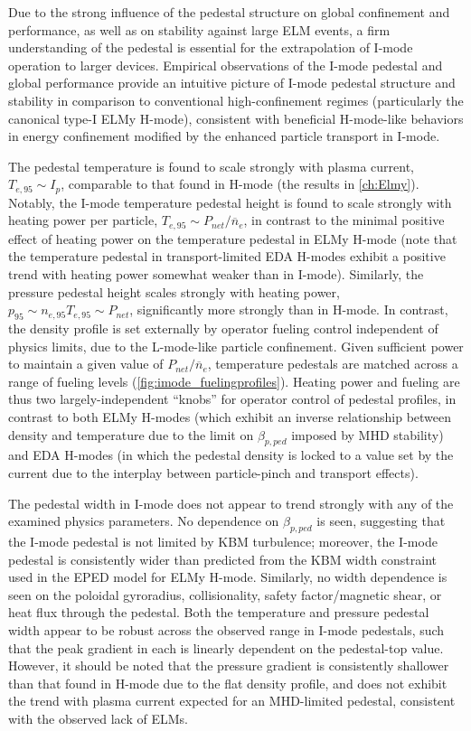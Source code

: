 Due to the strong influence of the pedestal structure on global confinement and performance, as well as on stability against large ELM events, a firm understanding of the pedestal is essential for the extrapolation of I-mode operation to larger devices.  Empirical observations of the I-mode pedestal and global performance provide an intuitive picture of I-mode pedestal structure and stability in comparison to conventional high-confinement regimes (particularly the canonical type-I ELMy H-mode), consistent with beneficial H-mode-like behaviors in energy confinement modified by the enhanced particle transport in I-mode.

The pedestal temperature is found to scale strongly with plasma current, $T_{e,95} \sim I_p$, comparable to that found in H-mode (\cf the results in \cref{ch:Elmy}).  Notably, the I-mode temperature pedestal height is found to scale strongly with heating power per particle, $T_{e,95} \sim P_{net}/\overline{n}_e$, in contrast to the minimal positive effect of heating power on the temperature pedestal in ELMy H-mode (note that the temperature pedestal in transport-limited EDA H-modes exhibit a positive trend with heating power somewhat weaker than in I-mode).    Similarly, the pressure pedestal height scales strongly with heating power, $p_{95} \sim n_{e,95} T_{e,95} \sim P_{net}$, significantly more strongly than in H-mode.  In contrast, the density profile is set externally by operator fueling control independent of physics limits, due to the L-mode-like particle confinement.  Given sufficient power to maintain a given value of $P_{net}/\overline{n}_e$, temperature pedestals are matched across a range of fueling levels (\cref{fig:imode_fuelingprofiles}).  Heating power and fueling are thus two largely-independent ``knobs'' for operator control of pedestal profiles, in contrast to both ELMy H-modes (which exhibit an inverse relationship between density and temperature due to the limit on $\beta_{p,ped}$ imposed by MHD stability) and EDA H-modes (in which the pedestal density is locked to a value set by the current due to the interplay between particle-pinch and transport effects).

The pedestal width in I-mode does not appear to trend strongly with any of the examined physics parameters.  No dependence on $\beta_{p,ped}$ is seen, suggesting that the I-mode pedestal is not limited by KBM turbulence; moreover, the I-mode pedestal is consistently wider than predicted from the KBM width constraint used in the EPED model for ELMy H-mode.  Similarly, no width dependence is seen on the poloidal gyroradius, collisionality, safety factor/magnetic shear, or heat flux through the pedestal.  Both the temperature and pressure pedestal width appear to be robust across the observed range in I-mode pedestals, such that the peak gradient in each is linearly dependent on the pedestal-top value.  However, it should be noted that the pressure gradient is consistently shallower than that found in H-mode due to the flat density profile, and does not exhibit the trend with plasma current expected for an MHD-limited pedestal, consistent with the observed lack of ELMs.


